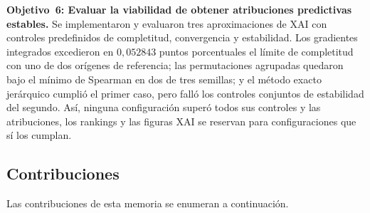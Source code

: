\textbf{Objetivo~6: Evaluar la viabilidad de obtener atribuciones predictivas estables.} Se implementaron y evaluaron tres aproximaciones de XAI con controles predefinidos de completitud, convergencia y estabilidad. Los gradientes integrados excedieron en $0{,}052843$ puntos porcentuales el límite de completitud con uno de dos orígenes de referencia; las permutaciones agrupadas quedaron bajo el mínimo de Spearman en dos de tres semillas; y el método exacto jerárquico cumplió el primer caso, pero falló los controles conjuntos de estabilidad del segundo. Así, ninguna configuración superó todos sus controles y las atribuciones, los rankings y las figuras XAI se reservan para configuraciones que sí los cumplan.


\subsection{Contribuciones}

Las contribuciones de esta memoria se enumeran a continuación.

